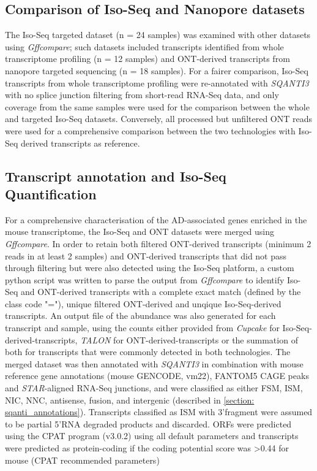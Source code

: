 \subsection{Comparison of Iso-Seq and Nanopore datasets}
The Iso-Seq targeted dataset (n = 24 samples) was examined with other datasets using \textit{Gffcompare}; such datasets included transcripts identified from whole transcriptome profiling (n = 12 samples) and ONT-derived transcripts from nanopore targeted sequencing (n = 18 samples). For a fairer comparison, Iso-Seq transcripts from whole transcriptome profiling were re-annotated with \textit{SQANTI3} with no splice junction filtering from short-read RNA-Seq data, and only coverage from the same samples were used for the comparison between the whole and targeted Iso-Seq datasets. Conversely, all processed but unfiltered ONT reads were used for a comprehensive comparison between the two technologies with Iso-Seq derived transcripts as reference.   

\subsection{Transcript annotation and Iso-Seq Quantification}
For a comprehensive characterisation of the AD-associated genes enriched in the mouse transcriptome, the Iso-Seq and ONT datasets were merged using \textit{Gffcompare}. In order to retain both filtered ONT-derived transcripts (minimum 2 reads in at least 2 samples) and ONT-derived transcripts that did not pass through filtering but were also detected using the Iso-Seq platform, a custom python script was written to parse the output from \textit{Gffcompare} to identify Iso-Seq and ONT-derived transcripts with a complete exact match (defined by the class code "="), unique filtered ONT-derived and unqique Iso-Seq-derived transcripts. An output file of the abundance was also generated for each transcript and sample, using the counts either provided from \textit{Cupcake} for Iso-Seq-derived-transcripts, \textit{TALON} for ONT-derived-transcripts or the summation of both for transcripts that were commonly detected in both technologies. The merged dataset was then annotated with \textit{SQANTI3} in combination with mouse reference gene annotations (mouse GENCODE, vm22), FANTOM5 CAGE peaks and \textit{STAR}-aligned RNA-Seq junctions, and were classified as either FSM, ISM, NIC, NNC, antisense, fusion, and intergenic (described in \cref{section: sqanti_annotations}). Transcripts classified as ISM with 3'fragment were assumed to be partial 5'RNA degraded products and discarded. ORFs were predicted using the CPAT program (v3.0.2) using all default parameters and transcripts were predicted as protein-coding if the coding potential score was >0.44 for mouse (CPAT recommended parameters)  

